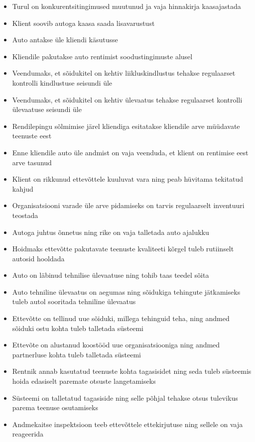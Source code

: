 \documentclass{report}
\begin{document}
\begin{itemize}
 	\item Turul on konkurentsitingimused muutunud ja vaja hinnakirja kaasajastada
 	\item Klient soovib autoga kaasa saada lisavarustust
 	\item Auto antakse üle kliendi käsutusse 
 	\item Kliendile pakutakse auto rentimist soodustingimuste alusel
 	\item Veendumaks, et sõidukitel on kehtiv liikluskindlustus tehakse regulaarset kontrolli kindlustuse seisundi üle
 	\item Veendumaks, et sõidukitel on kehtiv ülevaatus tehakse regulaarset kontrolli ülevaatuse seisundi üle
 	\item Rendilepingu sõlmimise järel kliendiga esitatakse kliendile arve müüdavate teenuste eest
 	\item Enne kliendile auto üle andmist on vaja veenduda, et klient on rentimise eest arve tasunud
 	\item Klient on rikkunud ettevõttele kuuluvat vara ning peab hüvitama tekitatud kahjud
 	\item Organisatsiooni varade üle arve pidamiseks on tarvis regulaarselt inventuuri teostada
 	\item Autoga juhtus õnnetus ning rike on vaja talletada auto ajalukku
 	\item Hoidmaks ettevõtte pakutavate teenuste kvaliteeti kõrgel tuleb rutiinselt autosid hooldada
 	\item Auto on läbinud tehnilise ülevaatuse ning tohib taas teedel sõita
 	\item Auto tehniline ülevaatus on aegumas ning sõidukiga tehingute jätkamiseks tuleb autol sooritada tehniline ülevaatus
 	\item Ettevõtte on tellinud uue sõiduki, millega tehinguid teha, ning andmed sõiduki ostu kohta tuleb talletada süsteemi
 	\item Ettevõte on alustanud koostööd uue organisatsiooniga ning andmed partnerluse kohta tuleb talletada süsteemi
 	\item Rentnik annab kasutatud teenuste kohta tagasisidet ning seda tuleb süsteemis hoida edasiselt paremate otsuste langetamiseks
 	\item Süsteemi on talletatud tagasiside ning selle põhjal tehakse otsus tulevikus parema teenuse osutamiseks
 	\item Andmekaitse inspektsioon teeb ettevõttele ettekirjutuse ning sellele on vaja reageerida
 \end{itemize}
 
\end{document}
